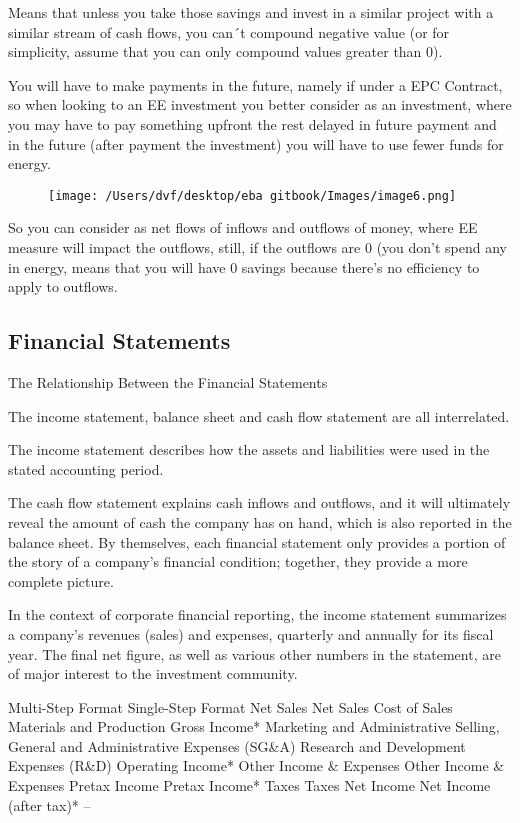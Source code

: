 \documentclass[]{book}
\theoremstyle{definition}
\theoremstyle{definition}
\theoremstyle{definition}
\theoremstyle{remark}
\begin{document}
Means that unless you take those savings and invest in a similar project
with a similar stream of cash flows, you can´t compound negative value
(or for simplicity, assume that you can only compound values greater
than 0).

You will have to make payments in the future, namely if under a EPC
Contract, so when looking to an EE investment you better consider as an
investment, where you may have to pay something upfront the rest delayed
in future payment and in the future (after payment the investment) you
will have to use fewer funds for energy.

\begin{figure}[htbp]
\centering
\texttt{[image: /Users/dvf/desktop/eba gitbook/Images/image6.png]}
\caption{}
\end{figure}

So you can consider as net flows of inflows and outflows of money, where
EE measure will impact the outflows, still, if the outflows are 0 (you
don't spend any in energy, means that you will have 0 savings because
there's no efficiency to apply to outflows.

\subsection{Financial Statements}\label{financial-statements}

The Relationship Between the Financial Statements

The income statement, balance sheet and cash flow statement are all
interrelated.

The income statement describes how the assets and liabilities were used
in the stated accounting period.

The cash flow statement explains cash inflows and outflows, and it will
ultimately reveal the amount of cash the company has on hand, which is
also reported in the balance sheet. By themselves, each financial
statement only provides a portion of the story of a company's financial
condition; together, they provide a more complete picture.

In the context of corporate financial reporting, the income statement
summarizes a company's revenues (sales) and expenses, quarterly and
annually for its fiscal year. The final net figure, as well as various
other numbers in the statement, are of major interest to the investment
community.

Multi-Step Format Single-Step Format Net Sales Net Sales Cost of Sales
Materials and Production Gross Income* Marketing and Administrative
Selling, General and Administrative Expenses (SG\&A) Research and
Development Expenses (R\&D) Operating Income* Other Income \& Expenses
Other Income \& Expenses Pretax Income Pretax Income* Taxes Taxes Net
Income Net Income (after tax)* --
\end{document}
